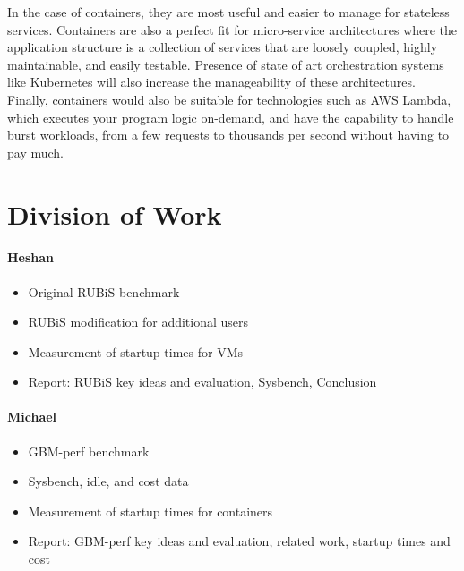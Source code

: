\documentclass[11pt]{article}
\begin{document}
In the case of containers, they are most useful and easier to manage for stateless services. Containers are also a perfect fit for micro-service architectures where the application structure is a collection of services that are loosely coupled, highly maintainable, and easily testable. Presence of state of art orchestration systems like Kubernetes will also increase the manageability of these architectures. Finally, containers would also be suitable for technologies such as AWS Lambda, which executes your program logic on-demand, and have the capability to handle burst workloads, from a few requests to thousands per second without having to pay much.

\vspace{3mm} %


\section{Division of Work}

\paragraph{Heshan}

\begin{itemize}
  \item Original RUBiS benchmark
  \item RUBiS modification for additional users
  \item Measurement of startup times for VMs
  \item Report: RUBiS key ideas and evaluation, Sysbench, Conclusion
\end{itemize}

\paragraph{Michael}

\begin{itemize}
  \item GBM-perf benchmark
  \item Sysbench, idle, and cost data
  \item Measurement of startup times for containers
  \item Report: GBM-perf key ideas and evaluation, related work, startup times and cost
\end{itemize}


\printbibliography
\end{document}
